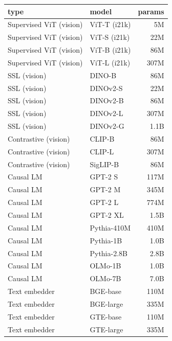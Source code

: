 \begin{table}[H]
\centering
\scriptsize
\setlength{\tabcolsep}{4pt}
\begin{tabular}{llr}
\toprule
type & model & params \\
\midrule
Supervised ViT (vision) & ViT-T (i21k) \citep{dosovitskiy2021an} & 5M \\
Supervised ViT (vision) & ViT-S (i21k) \citep{dosovitskiy2021an} & 22M \\
Supervised ViT (vision) & ViT-B (i21k) \citep{dosovitskiy2021an} & 86M \\
Supervised ViT (vision) & ViT-L (i21k) \citep{dosovitskiy2021an} & 307M \\
SSL (vision) & DINO-B \citep{dinov1} & 86M \\
SSL (vision) & DINOv2-S \citep{dinov2} & 22M \\
SSL (vision) & DINOv2-B \citep{dinov2} & 86M \\
SSL (vision) & DINOv2-L \citep{dinov2} & 307M \\
SSL (vision) & DINOv2-G \citep{dinov2} & 1.1B \\
Contrastive (vision) & CLIP-B \citep{CLIP} & 86M \\
Contrastive (vision) & CLIP-L \citep{CLIP} & 307M \\
Contrastive (vision) & SigLIP-B \citep{siglip} & 86M \\
\midrule
Causal LM & GPT-2 S \citep{gpt2} & 117M \\
Causal LM & GPT-2 M \citep{gpt2} & 345M \\
Causal LM & GPT-2 L \citep{gpt2} & 774M \\
Causal LM & GPT-2 XL \citep{gpt2} & 1.5B \\
Causal LM & Pythia-410M \citep{pythia} & 410M \\
Causal LM & Pythia-1B \citep{pythia} & 1.0B \\
Causal LM & Pythia-2.8B \citep{pythia} & 2.8B \\
Causal LM & OLMo-1B \citep{olmo} & 1.0B \\
Causal LM & OLMo-7B \citep{olmo} & 7.0B \\
Text embedder & BGE-base \citep{BGE} & 110M \\
Text embedder & BGE-large \citep{BGE} & 335M \\
Text embedder & GTE-base \citep{gte} & 110M \\
Text embedder & GTE-large \citep{gte} & 335M \\

\end{tabular}
\end{table}
